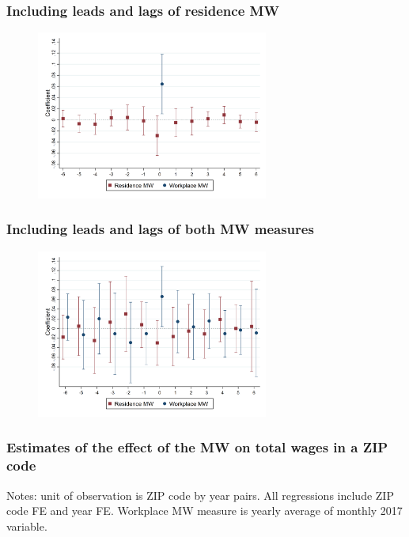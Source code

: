 \documentclass[aspectratio=169, t]{beamer}
\begin{document}
\begin{frame}[label = res_only_dyn]
    \frametitle{Including leads and lags of residence MW}

    \begin{figure}
        \centering
        \includegraphics[width=0.68\textwidth]{fd_baseline/output/fd_both_mw_res_only_dynamic.png}
    \end{figure}
    
    \hyperlink{dyn_baseline_plot}{}
\end{frame}

\begin{frame}[label = both_dyn]
    \frametitle{Including leads and lags of both MW measures}

    \begin{figure}
        \centering
        \includegraphics[width=0.68\textwidth]{fd_baseline/output/fd_both_dynamic.png}
    \end{figure}
    
    \hyperlink{dyn_baseline_plot}{}
\end{frame}

\begin{frame}[label = wages_results]
    \frametitle{Estimates of the effect of the MW on total wages in a ZIP code}

    \vspace{2mm}
    
    
    \vspace{2mm}
    {\footnotesize
    Notes: unit of observation is ZIP code by year pairs. 
    All regressions include ZIP code FE and year FE.
    Workplace MW measure is yearly average of monthly 2017 variable.}

    \vspace{2mm}
    \hyperlink{share_pocketed_model}{}
\end{frame}
\end{document}
